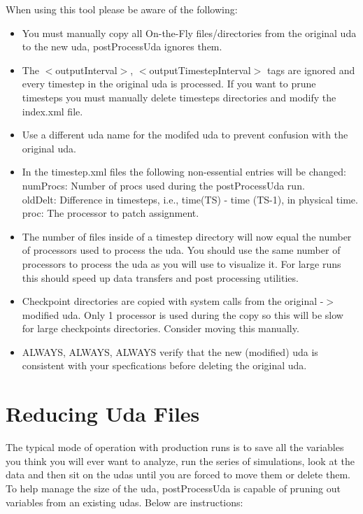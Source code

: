 When using this tool please be aware of the following:
\begin{itemize}
    \item You must manually copy all On-the-Fly files/directories from the original uda to the new uda, postProcessUda ignores them.
    \item The $<$outputInterval$>$, $<$outputTimestepInterval$>$ tags are ignored and every
      timestep in the original uda is processed.  If you want to prune timesteps
      you must manually delete timesteps directories and modify the index.xml file.
    \item Use a different uda name for the modifed uda to prevent confusion with the original uda.
    \item In the timestep.xml files the following non-essential entries will be changed:\\
           numProcs:      Number of procs used during the postProcessUda run.\\
           oldDelt:       Difference in timesteps, i.e., time(TS) - time (TS-1), in physical time.\\
           proc:          The processor to patch assignment.
    \item The number of files inside of a timestep directory will now equal the number of processors used to process the uda.  You should use the same number of processors to process the uda as you will use to visualize it. For large runs this should speed up data transfers and post processing utilities.
    \item Checkpoint directories are copied with system calls from the original -$>$ modified uda.
      Only 1 processor is used during the copy so this will be slow for large checkpoints directories.
      Consider moving this manually.
    \item ALWAYS, ALWAYS, ALWAYS verify that the new (modified) uda is consistent
      with your specfications before deleting the original uda.
 \end{itemize}



\section{Reducing Uda Files}
The typical mode of operation with production runs is to save all the variables you think you will ever want to analyze, run the series of simulations, look at the data and then sit on the udas until you are forced to move them or delete them.  To help manage the size of the uda, postProcessUda is capable of pruning out variables from an existing udas.
Below are instructions:

